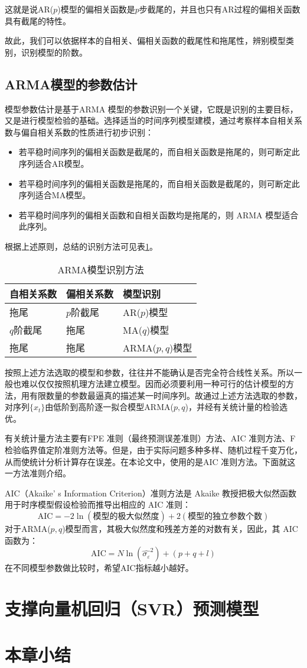 这就是说AR($p$)模型的偏相关函数是$p$步截尾的，并且也只有AR过程的偏相关函数具有截尾的特性。

故此，我们可以依据样本的自相关、偏相关函数的截尾性和拖尾性，辨别模型类别，识别模型的阶数。

\subsection{ARMA模型的参数估计}
模型参数估计是基于ARMA 模型的参数识别一个关键，它既是识别的主要目标，又是进行模型检验的基础。选择适当的时间序列模型建模，通过考察样本自相关系数与偏自相关系数的性质进行初步识别：
\begin{itemize}
	\item 若平稳时间序列的偏相关函数是截尾的，而自相关函数是拖尾的，则可断定此序列适合AR模型。
	\item 若平稳时间序列的偏相关函数是拖尾的，而自相关函数是截尾的，则可断定此序列适合MA模型。
	\item 若平稳时间序列的偏相关函数和自相关函数均是拖尾的，则 ARMA 模型适合此序列。
\end{itemize}
根据上述原则，总结的识别方法可见表\ref{tab:ARMAshibie}。
\begin{table}[htbp] 
	\centering
	\caption{\label{tab:ARMAshibie}ARMA模型识别方法} 
	\begin{tabular}{lll} 
		\toprule 
		自相关系数 & 偏相关系数 & 模型识别\\ 
		\midrule
		拖尾 & $p$阶截尾 & AR($p$)模型 \\
		$q$阶截尾 & 拖尾 & MA($q$)模型\\ 
		拖尾 & 拖尾 & ARMA($p,q$)模型\\
		\bottomrule 
	\end{tabular} 
\end{table}

按照上述方法选取的模型和参数，往往并不能确认是否完全符合线性关系。所以一般也难以仅仅按照机理方法建立模型。因而必须要利用一种可行的估计模型的方法，用有限数量的参数最逼真的描述某一时间序列。故通过上述方法选取的参数，对序列$\{ x_t\}$由低阶到高阶逐一拟合模型ARMA($p,q$)，并经有关统计量的检验选优。

有关统计量方法主要有FPE 准则（最终预测误差准则）方法、AIC 准则方法、F 检验临界值定阶准则方法等。但是，由于实际问题多种多样、随机过程千变万化，从而使统计分析计算存在误差。在本论文中，使用的是AIC 准则方法。下面就这一方法准则介绍。

AIC（Akaike’ s Information Criterion）准则方法是 Akaike 教授把极大似然函数用于时序模型假设检验而推导出相应的 AIC 准则：
$$	\mathrm{AIC} = -2\ln(\text{模型的极大似然度} )+2(\text{模型的独立参数个数}) $$
对于ARMA($p,q$)模型而言，其极大似然度和残差方差的对数有关，因此，其 AIC 函数为：
\begin{equation}
	\mathrm{AIC} = N\ln({\hat{\sigma_\varepsilon}}^2)+(p+q+l)
\end{equation}
在不同模型参数做比较时，希望AIC指标越小越好。

\section{支撑向量机回归（SVR）预测模型}


\section{本章小结}
